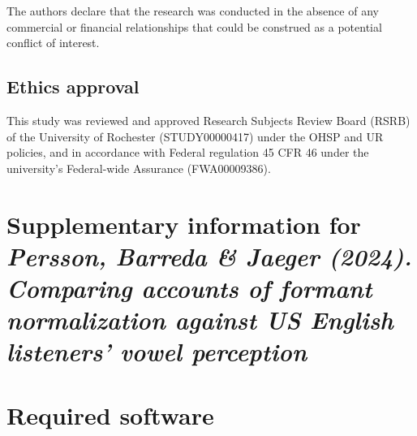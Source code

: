\documentclass[preprint]{JASA}
\begin{document}
The authors declare that the research was conducted in the absence of any commercial or financial relationships that could be construed as a potential conflict of interest.

\subsection*{Ethics approval}\label{ethics-approval}

This study was reviewed and approved Research Subjects Review Board (RSRB) of the University of Rochester (STUDY00000417) under the OHSP and UR policies, and in accordance with Federal regulation 45 CFR 46 under the university's Federal-wide Assurance (FWA00009386).

\newpage

\section*{\texorpdfstring{Supplementary information for \emph{Persson, Barreda \& Jaeger (2024). Comparing accounts of formant normalization against US English listeners' vowel perception}}{Supplementary information for Persson, Barreda \& Jaeger (2024). Comparing accounts of formant normalization against US English listeners' vowel perception}}\label{supplementary-information-for-persson-barreda-jaeger-2024.-comparing-accounts-of-formant-normalization-against-us-english-listeners-vowel-perception}

\singlespacing

\setcounter{page}{1}
\setcounter{section}{0}
\setcounter{footnote}{0}
\setcounter{figure}{0}
\setcounter{table}{0}
\setcounter{equation}{0}

\renewcommand{\thesection}{\S \arabic{section}}
\renewcommand{\thefootnote}{S\arabic{footnote}}
\renewcommand{\thefigure}{S\arabic{figure}}
\renewcommand{\thetable}{S\arabic{table}}
\renewcommand{\theequation}{S\arabic{equation}}

\renewcommand{\theHsection}{S\arabic{section}}
\renewcommand{\theHfootnote}{S\arabic{footnote}}
\renewcommand{\theHfigure}{S\arabic{figure}}
\renewcommand{\theHtable}{S\arabic{table}}
\renewcommand{\theHequation}{S\arabic{equation}}

\section{Required software}\label{sec:SI-software}
\end{document}

